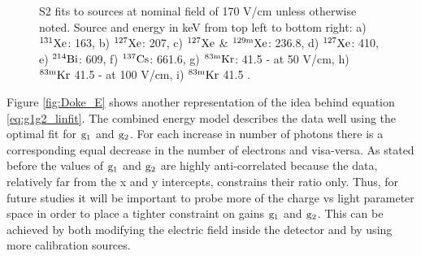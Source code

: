 \begin{figure}[h!]
\bigskip

\hfill
{}
\hfill
{}

\caption{S2 fits to sources at nominal field of 170 V/cm unless otherwise noted. Source and energy in keV from top left to bottom right: a) $\rm ^{131}Xe$: 163, b) $\rm ^{127}Xe$:  207, c) $\rm ^{127}Xe$ \&  $\rm ^{129m}Xe$: 236.8, d)  $\rm ^{127}Xe$: 410, e) $\rm ^{214}Bi$: 609, f) $\rm ^{137}Cs$: 661.6, g) $\rm ^{83m}Kr$: 41.5 - at 50 V/cm, h) $\rm ^{83m}Kr$ 41.5 - at 100 V/cm, i) $\rm ^{83m}Kr$ 41.5 .}
\label{fig:Doke_Fits_S2}
\end{figure}


Figure \ref{fig:Doke_E} shows another representation of the idea behind equation \ref{eq:g1g2_linfit}. The combined energy model describes the data well using the optimal fit for $\rm g_1$ and $\rm g_2$. For each increase in number of photons there is a corresponding equal decrease in the number of electrons and visa-versa. As stated before the values of $\rm g_1$ and $\rm g_2$ are highly anti-correlated because the data, relatively far from the x and y intercepts, constrains their ratio only. Thus, for future studies it will be important to probe more of the charge vs light parameter space in order to place a tighter constraint on gains $\rm g_1$ and $\rm g_2$. This can be achieved by both modifying the electric field inside the detector and by using more calibration sources.


